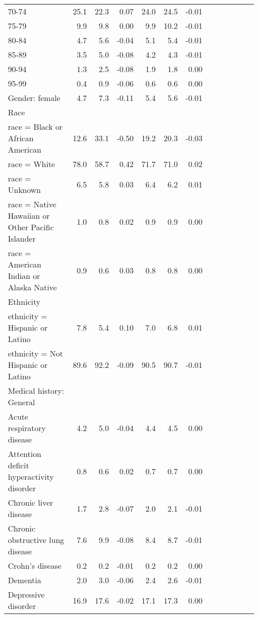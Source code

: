\documentclass[11pt,]{article}
\begin{document}
\begin{longtable}{lrrrrrrrrrrrr}
      70-74 & 25.1 & 22.3 &  0.07 & 24.0 & 24.5 & -0.01 \\ 
      75-79 &  9.9 &  9.8 &  0.00 &  9.9 & 10.2 & -0.01 \\ 
      80-84 &  4.7 &  5.6 & -0.04 &  5.1 &  5.4 & -0.01 \\ 
      85-89 &  3.5 &  5.0 & -0.08 &  4.2 &  4.3 & -0.01 \\ 
      90-94 &  1.3 &  2.5 & -0.08 &  1.9 &  1.8 &  0.00 \\ 
      95-99 &  0.4 &  0.9 & -0.06 &  0.6 &  0.6 &  0.00 \\ 
  Gender: female &  4.7 &  7.3 & -0.11 &  5.4 &  5.6 & -0.01 \\ 
  Race &    &    &     &    &    &     \\ 
      race = Black or African American & 12.6 & 33.1 & -0.50 & 19.2 & 20.3 & -0.03 \\ 
      race = White & 78.0 & 58.7 &  0.42 & 71.7 & 71.0 &  0.02 \\ 
      race = Unknown &  6.5 &  5.8 &  0.03 &  6.4 &  6.2 &  0.01 \\ 
      race = Native Hawaiian or Other Pacific Islander &  1.0 &  0.8 &  0.02 &  0.9 &  0.9 &  0.00 \\ 
      race = American Indian or Alaska Native &  0.9 &  0.6 &  0.03 &  0.8 &  0.8 &  0.00 \\ 
  Ethnicity &    &    &     &    &    &     \\ 
      ethnicity = Hispanic or Latino &  7.8 &  5.4 &  0.10 &  7.0 &  6.8 &  0.01 \\ 
      ethnicity = Not Hispanic or Latino & 89.6 & 92.2 & -0.09 & 90.5 & 90.7 & -0.01 \\ 
  Medical history: General &    &    &     &    &    &     \\ 
      Acute respiratory disease &  4.2 &  5.0 & -0.04 &  4.4 &  4.5 &  0.00 \\ 
      Attention deficit hyperactivity disorder &  0.8 &  0.6 &  0.02 &  0.7 &  0.7 &  0.00 \\ 
      Chronic liver disease &  1.7 &  2.8 & -0.07 &  2.0 &  2.1 & -0.01 \\ 
      Chronic obstructive lung disease &  7.6 &  9.9 & -0.08 &  8.4 &  8.7 & -0.01 \\ 
      Crohn's disease &  0.2 &  0.2 & -0.01 &  0.2 &  0.2 &  0.00 \\ 
      Dementia &  2.0 &  3.0 & -0.06 &  2.4 &  2.6 & -0.01 \\ 
      Depressive disorder & 16.9 & 17.6 & -0.02 & 17.1 & 17.3 &  0.00 \\ 

\end{longtable}
\end{document}
